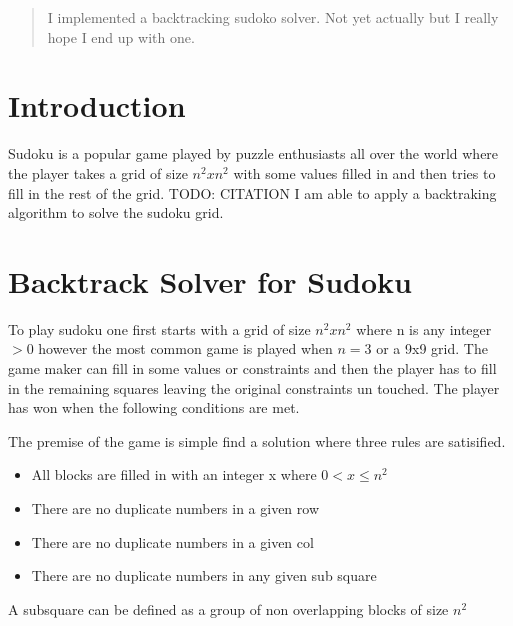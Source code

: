 \documentclass{sig-alternate}
\begin{document}
\maketitle
\begin{abstract}
I implemented a backtracking sudoko solver. Not yet actually but I really hope I end up with one. 
\end{abstract}




\section{Introduction}
Sudoku is a popular game played by puzzle enthusiasts all over the world where the player takes 
a grid of size $n^2 x n^2$ with some values filled in and then tries to fill in the rest of the grid. TODO: CITATION
I am able to apply a backtraking algorithm to solve the sudoku grid. 

\section{Backtrack Solver for Sudoku}

To play sudoku one first starts with a grid of size $n^2 x n^2$ where n is any integer $> 0$ however the most common game is 
played when $n = 3$ or a 9x9 grid. The game maker can fill in some values or constraints and then the player has to fill in
the remaining squares leaving the original constraints un touched. The player has won when the following conditions are met.

The premise of the game is simple find a solution where three rules are satisified.
\begin{itemize}
\item{All blocks are filled in with an integer x where $0 < x \le n^2$}
\item{There are no duplicate numbers in a given row}
\item{There are no duplicate numbers in a given col}
\item{There are no duplicate numbers in any given sub square}
\end{itemize}
A subsquare can be defined as a group of non overlapping blocks of size $n^2$
\end{document}
